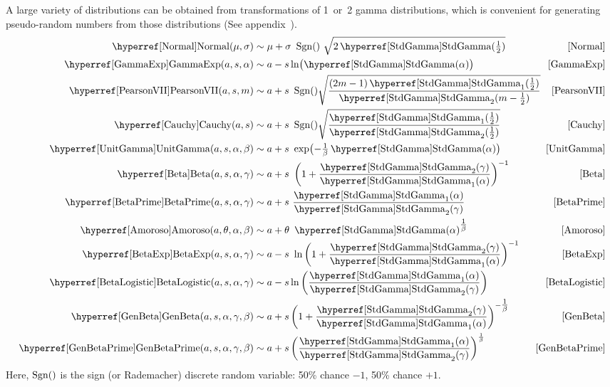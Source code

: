 A large variety of distributions can be obtained from transformations of 1~or~2 gamma distributions, which is convenient for generating pseudo-random numbers from those distributions (See appendix~). \label{gammatransforms}
\begin{align*}
\opr{Normal}(\mu,\sigma)   &\sim  \mu+ \sigma\ \op{Sgn}()\ \sqrt{ 2 \opr{StdGamma}(\half) } 		& \eqref{Normal}
\checked
\\
\opr{GammaExp}(a,s,\alpha) &\sim a - s \ln\bigl(\opr{StdGamma}(\alpha)\bigr) 		& \eqref{GammaExp} \checked
\\
\opr{PearsonVII}(a,s, m) & \sim a + s\ \op{Sgn}() \sqrt{ \frac{(2m-1) \opr{StdGamma}_1(\half)}{\opr{StdGamma}_2(m-\half) } }		 \hspace{-1.5em}& \eqref{PearsonVII} 
\\
 \opr{Cauchy}(a,s) & \sim a + s\ \op{Sgn}() \sqrt{\frac{\opr{StdGamma}_1(\half)}{\opr{StdGamma}_2(\half) } } 		& \eqref{Cauchy} \checked %
\\
\opr{UnitGamma}(a,s,\alpha,\beta) &\sim a+ s\ \exp  \bigl(- \tfrac{1}{\beta}\opr{StdGamma}(\alpha)\bigr)		& \eqref{UnitGamma} \checked
\\
\opr{Beta}(a,s,\alpha,\gamma) & 
\sim a + s\   \left(1 + \frac{\opr{StdGamma}_2(\gamma)}{\opr{StdGamma}_1(\alpha)} \right)^{-1}
& \eqref{Beta} \checked 
\\
\opr{BetaPrime}(a,s,\alpha,\gamma) &\sim  a + s\ \frac{\opr{StdGamma}_1(\alpha)}{\opr{StdGamma}_2(\gamma) }		& \eqref{BetaPrime}
\checked
\\
\opr{Amoroso}(a,\theta,\alpha,\beta)&\sim a + \theta\ \opr{StdGamma}(\alpha)^{\tfrac{1}{\beta}}		& \eqref{Amoroso}
\checked
\\
\opr{BetaExp}(a,s, \alpha,\gamma)  & 
\sim a - s\ \ln   \left(1 + \frac{\opr{StdGamma}_2(\gamma)}{\opr{StdGamma}_1(\alpha)} \right)^{-1}	
& \eqref{BetaExp} \checked  
\\
\opr{BetaLogistic}(a,s,\alpha,\gamma) &\sim  a - s \ln \left(\frac{\opr{StdGamma}_1(\alpha)}{\opr{StdGamma}_2(\gamma) } \right)		& \eqref{BetaLogistic} \checked
\\
\opr{GenBeta}(a,s,\alpha,\gamma,\beta) &
 \sim a + s  \left(1 + \frac{\opr{StdGamma}_2(\gamma)}{\opr{StdGamma}_1(\alpha)} \right)^{-\tfrac{1}{\beta}}		& \eqref{GenBeta} \checked
\\
\opr{GenBetaPrime}(a,s,\alpha,\gamma,\beta) & \sim  a+ s \left( \frac{\opr{StdGamma}_1(\alpha)}{\opr{StdGamma}_2(\gamma) }\right)^{\frac{1}{\beta}}		& \eqref{GenBetaPrime}
\checked 
\end{align*}
Here, $\operatorname{Sgn}()$ is the sign (or Rademacher) discrete random variable: 50\% chance $-1$, 50\% chance $+1$.


